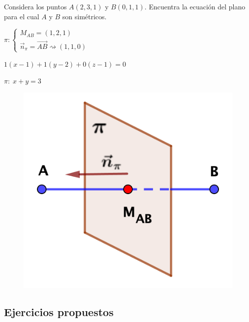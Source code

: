\begin{ejre}
	Considera los puntos $A(2,3,1)$ y $B(0,1,1)$. Encuentra la ecuación del plano para el cual $A$ y $B$ son simétricos.
\end{ejre}
\begin{proofw}\renewcommand{\qedsymbol}{$\diamond$}	

\begin{multicols}{2}	
$\pi:\begin{cases} M_{AB}=(1,2,1)\\\vec n_{\pi}=\overrightarrow{AB}\rightsquigarrow (1,1,0)	\end{cases}$

\noindent $1(x-1)+1(y-2)+0(z-1)=0$

\noindent $\pi:\; x+y=3$
	\begin{figure}[H]
		\centering
		\includegraphics[width=.35\textwidth]{imagenes/imagenes11/T11IM34.png}
	\end{figure}
\end{multicols}
\end{proofw}

\subsection{Ejercicios propuestos}


